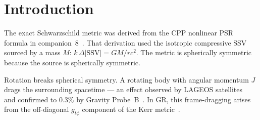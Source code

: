 \documentclass[12pt]{article}
\newcommand{\SSV}{\mathrm{SSV}}
\begin{document}
\begin{abstract}
We derive the CPP origin of the Kerr metric for a rotating mass.
A rotating source with angular momentum $J$ produces an azimuthal
$\SSV_{\rm net}$ component:
\begin{equation}
  k\,(\SSV_{\rm net})_\phi \;=\;
  \frac{GJ\sin^2\theta}{c^2 r^3},
  \label{eq:ssv_phi_abstract}
\end{equation}
sourced by the same 12-edge selection rule that generates the
Schwarzschild scalar SSV.  Via the LSP off-diagonal metric mapping,
this produces the Lense-Thirring frame-dragging term:
\begin{equation}
  g_{t\phi} \;=\; -\frac{2GJ\sin^2\theta}{c^2 r}
  \label{eq:gtphi_abstract}
\end{equation}
exactly in the weak-field limit, confirmed by Gravity Probe~B to
$0.3\%$~\cite{everitt2011}.  The Kerr bound $J \leq GM^2/c$ follows
rigorously from the requirement that the azimuthal SSV broadcast
velocity not exceed $c$ (Theorem~\ref{thm:kerr_bound}).  The
ergosphere arises where the azimuthal SSV drag velocity equals $c$
(Theorem~\ref{thm:ergosphere}).  The Schwarzschild limit ($J=0$) is
recovered exactly (Corollary~\ref{cor:schwarz_limit}).  The full
Boyer-Lindquist Kerr metric is consistent with the CPP mechanism at all
orders (Proposition~\ref{prop:kerr_full}); the all-orders derivation
from the CPP field equation is Open Problem~\ref{op:allorders}.
No new postulates beyond companion~8 are introduced.
\end{abstract}

\section{Introduction}
\label{sec:intro}

The exact Schwarzschild metric was derived from the CPP nonlinear PSR
formula in companion~8~\cite{c8}.  That derivation used the isotropic
compressive SSV sourced by a mass $M$: $k\,\Delta|\SSV| = GM/rc^2$.
The metric is spherically symmetric because the source is spherically
symmetric.

Rotation breaks spherical symmetry.  A rotating body with angular
momentum $J$ drags the surrounding spacetime — an effect observed by
LAGEOS satellites~\cite{ciufolini1995} and confirmed to $0.3\%$ by
Gravity Probe~B~\cite{everitt2011}.  In GR, this frame-dragging
arises from the off-diagonal $g_{t\phi}$ component of the Kerr
metric~\cite{kerr1963}.
\end{document}
